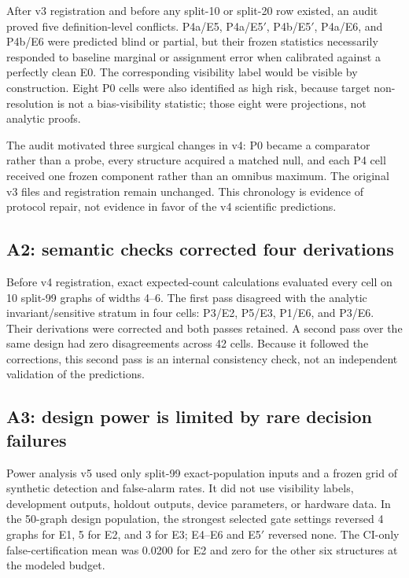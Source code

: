 \documentclass[10pt,twocolumn]{article}
\begin{document}
After v3 registration and before any split-10 or split-20 row existed, an audit
proved five definition-level conflicts. P4a/E5, P4a/E5$'$, P4b/E5$'$,
P4a/E6, and P4b/E6 were predicted blind or partial, but their frozen statistics
necessarily responded to baseline marginal or assignment error when calibrated
against a perfectly clean E0. The corresponding visibility label would be
visible by construction. Eight P0 cells were also identified as high risk,
because target non-resolution is not a bias-visibility statistic; those eight
were projections, not analytic proofs.

The audit motivated three surgical changes in v4: P0 became a comparator rather
than a probe, every structure acquired a matched null, and each P4 cell received
one frozen component rather than an omnibus maximum. The original v3 files and
registration remain unchanged. This chronology is evidence of protocol repair,
not evidence in favor of the v4 scientific predictions.

\subsection{A2: semantic checks corrected four derivations}

Before v4 registration, exact expected-count calculations evaluated every cell
on 10 split-99 graphs of widths 4--6. The first pass disagreed with the analytic
invariant/sensitive stratum in four cells: P3/E2, P5/E3, P1/E6, and P3/E6.
Their derivations were corrected and both passes retained. A second pass over
the same design had zero disagreements across 42 cells. Because it followed
the corrections, this second pass is an internal consistency check, not an
independent validation of the predictions.

\subsection{A3: design power is limited by rare decision failures}\label{sec:power}

Power analysis v5 used only split-99 exact-population inputs and a frozen grid
of synthetic detection and false-alarm rates. It did not use visibility labels,
development outputs, holdout outputs, device parameters, or hardware data. In
the 50-graph design population, the strongest selected gate settings reversed
4 graphs for E1, 5 for E2, and 3 for E3; E4--E6 and E5$'$ reversed none. The
CI-only false-certification mean was 0.0200 for E2 and zero for the other six
structures at the modeled budget.
\end{document}
